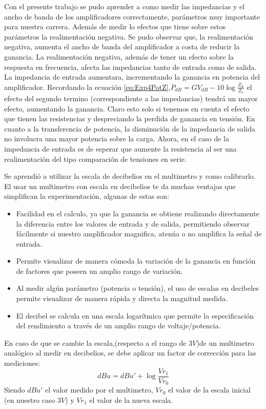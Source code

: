 Con el presente trabajo se pudo aprender a como medir las impedancias y el ancho de banda de los amplificadores correctamente, parámetros muy importante para nuestra carrera. Además de medir lo efectos que tiene sobre estos parámetros la realimentación negativa.
Se pudo observar que, la realimentación negativa, aumenta el ancho de banda del amplificador a costa de reducir la ganancia. La realimentación negativa, además de tener un efecto sobre la respuesta en frecuencia, afecta las impedancias tanto de entrada como de salida. La impedancia de entrada aumentara, incrementando la ganancia en potencia del amplificador. Recordando la ecuación \ref{eq:Exp4PotZ},$P_{dB}=GV_{dB}-10\log{\frac{Z_L}{Z_e}}$ el efecto del segundo termino (correspondiente a las impedancias) tendrá un mayor efecto, aumentando la ganancia. Claro esto solo si tenemos en cuenta el efecto que tienen las resistencias y despreciando la perdida de ganancia en tensión. En cuanto a la transferencia de potencia, la disminución de la impedancia de salida no involucra una mayor potencia sobre la carga. Ahora, en el caso de la impedancia de entrada es de esperar que aumente la resistencia al ser una realimentación del tipo comparación de tensiones en serie.

Se aprendió a utilizar la escala de decibelios en el multimetro y como calibrarlo.
El usar un multimetro con escala en decibelios te da muchas ventajas que simplifican la experimentación, algunas de estas son:
\begin{itemize}
    \item Facilidad en el calculo, ya que la ganancia se obtiene realizando directamente la diferencia entre los valores de entrada y de salida, permitiendo observar fácilmente si nuestro amplificador magnifica, atenúa o no amplifica la señal de entrada.
    \item Permite visualizar de manera cómoda la variación de la ganancia en función de factores que poseen un amplio rango de variación.
    \item Al medir algún parámetro (potencia o tensión), el uso de escalas en decibeles permite visualizar de manera rápida y directa la magnitud medida. 
    \item El decibel se calcula en una escala logarítmica que permite la especificación del rendimiento a través de un amplio rango de voltaje/potencia.
\end{itemize}

En caso de que se cambie la escala,(respecto a el rango de $3V$)de un multimetro analógico al medir en decibelios, se debe aplicar un factor de corrección para las mediciones:
\begin{equation}
    dBu=dBu'+\log{\frac{Vr_1}{Vr_0}}
\end{equation}
Siendo $dBu'$ el valor medido por el multimetro, $Vr_0$ el valor de la escala inicial (en nuestro caso $3V$) y $Vr_1$ el valor de la nueva escala.

